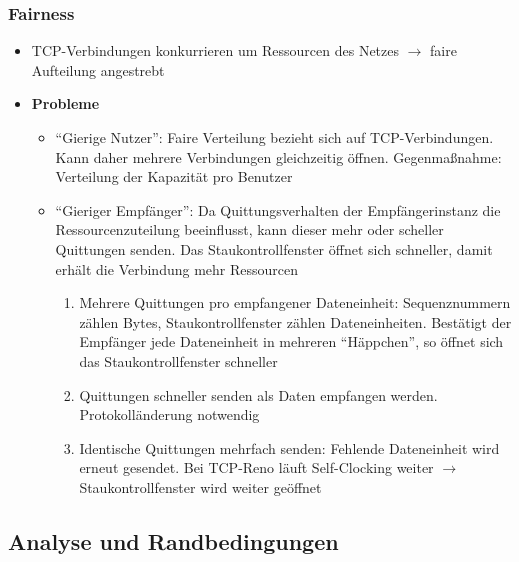 \subsubsection{Fairness}
\begin{itemize}
	\item TCP-Verbindungen konkurrieren um Ressourcen des Netzes \(\rightarrow\) faire Aufteilung angestrebt
	\item \textbf{Probleme}
	\begin{itemize}
		\item "`Gierige Nutzer"': Faire Verteilung bezieht sich auf TCP-Verbindungen. Kann daher mehrere Verbindungen gleichzeitig öffnen. Gegenmaßnahme: Verteilung der Kapazität pro Benutzer
		\item "`Gieriger Empfänger"': Da Quittungsverhalten der Empfängerinstanz die Ressourcenzuteilung beeinflusst, kann dieser mehr oder scheller Quittungen senden. Das Staukontrollfenster öffnet sich schneller, damit erhält die Verbindung mehr Ressourcen
		\begin{enumerate}
			\item Mehrere Quittungen pro empfangener Dateneinheit: Sequenznummern zählen Bytes, Staukontrollfenster zählen Dateneinheiten. Bestätigt der Empfänger jede Dateneinheit in mehreren "`Häppchen"', so öffnet sich das Staukontrollfenster schneller
			\item Quittungen schneller senden als Daten empfangen werden. Protokolländerung notwendig
			\item Identische Quittungen mehrfach senden: Fehlende Dateneinheit wird erneut gesendet. Bei TCP-Reno läuft Self-Clocking weiter \(\rightarrow\) Staukontrollfenster wird weiter geöffnet
		\end{enumerate}
	\end{itemize}
\end{itemize}

\subsection{Analyse und Randbedingungen}

